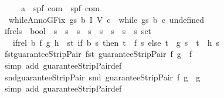 \begin{isabellebody}
\ \ \ \ \ {\isacharparenleft}{\isacharprime}a\ {\isasymRightarrow}\ {\isacharparenleft}{\isacharprime}s{\isacharcomma}{\isacharprime}p{\isacharcomma}{\isacharprime}f{\isacharparenright}\ com{\isacharparenright}\ {\isasymRightarrow}\ {\isacharparenleft}{\isacharprime}s{\isacharcomma}{\isacharprime}p{\isacharcomma}{\isacharprime}f{\isacharparenright}\ com{\isachardoublequoteclose}\ \isanewline
\ \ {\isachardoublequoteopen}whileAnnoGFix\ gs\ b\ I\ V\ c\ {\isacharequal}\ while\ gs\ b\ {\isacharparenleft}c\ undefined{\isacharparenright}{\isachardoublequoteclose}\isanewline
\isanewline
{}\isamarkupfalse%
\ if{\isacharunderscore}rel{\isacharcolon}{\isacharcolon}{\isachardoublequoteopen}{\isacharparenleft}{\isacharprime}s\ {\isasymRightarrow}\ bool{\isacharparenright}\ {\isasymRightarrow}\ {\isacharparenleft}{\isacharprime}s\ {\isasymRightarrow}\ {\isacharprime}s{\isacharparenright}\ {\isasymRightarrow}\ {\isacharparenleft}{\isacharprime}s\ {\isasymRightarrow}\ {\isacharprime}s{\isacharparenright}\ {\isasymRightarrow}\ {\isacharparenleft}{\isacharprime}s\ {\isasymRightarrow}\ {\isacharprime}s{\isacharparenright}\ {\isasymRightarrow}\ {\isacharparenleft}{\isacharprime}s\ {\isasymtimes}\ {\isacharprime}s{\isacharparenright}\ set{\isachardoublequoteclose}\ \isanewline
\ \ \ {\isachardoublequoteopen}if{\isacharunderscore}rel\ b\ f\ g\ h\ {\isacharequal}\ {\isacharbraceleft}{\isacharparenleft}s{\isacharcomma}t{\isacharparenright}{\isachardot}\ if\ b\ s\ then\ t\ {\isacharequal}\ f\ s\ else\ t\ {\isacharequal}\ g\ s\ {\isasymor}\ t\ {\isacharequal}\ h\ s{\isacharbraceright}{\isachardoublequoteclose}\isanewline
\isanewline
{}\isamarkupfalse%
\ fst{\isacharunderscore}guaranteeStripPair{\isacharcolon}\ {\isachardoublequoteopen}fst\ {\isacharparenleft}guaranteeStripPair\ f\ g{\isacharparenright}\ {\isacharequal}\ f{\isachardoublequoteclose}\isanewline
%
\isadelimproof
\ \ %
\endisadelimproof
%
\isatagproof
{}\isamarkupfalse%
\ {\isacharparenleft}simp\ add{\isacharcolon}\ guaranteeStripPair{\isacharunderscore}def{\isacharparenright}%
\endisatagproof
{\isafoldproof}%
%
\isadelimproof
\isanewline
%
\endisadelimproof
\isanewline
{}\isamarkupfalse%
\ snd{\isacharunderscore}guaranteeStripPair{\isacharcolon}\ {\isachardoublequoteopen}snd\ {\isacharparenleft}guaranteeStripPair\ f\ g{\isacharparenright}\ {\isacharequal}\ g{\isachardoublequoteclose}\isanewline
%
\isadelimproof
\ \ %
\endisadelimproof
%
\isatagproof
{}\isamarkupfalse%
\ {\isacharparenleft}simp\ add{\isacharcolon}\ guaranteeStripPair{\isacharunderscore}def{\isacharparenright}%

\end{isabellebody}
